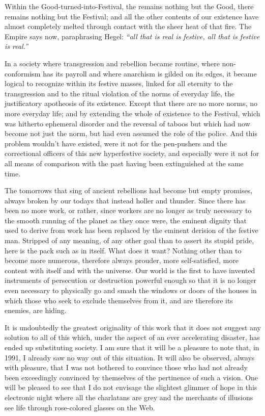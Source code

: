 Within the Good-turned-into-Festival, the remains nothing but the Good, there remains nothing but the Festival; and all the other contents of our existence have almost completely melted through contact with the sheer heat of that fire. The Empire says now, paraphrasing Hegel: \textit{``all that is real is festive, all that is festive is real.''}

In a society where transgression and rebellion became routine, where non-conformism has its payroll and where anarchism is gilded on its edges, it became logical to recognize within its festive masses, linked for all eternity to the transgression and to the ritual violation of the norms of everyday life, the justificatory apotheosis of its existence. Except that there are no more norms, no more everyday life; and by extending the whole of existence to the Festival, which was hitherto ephemeral disorder and the reversal of taboos but which had now become not just the norm, but had even assumed the role of the police. And this problem wouldn't have existed, were it not for the pen-pushers and the correctional officers of this new hyperfestive society, and especially were it not for all means of comparison with the past having been extinguished at the same time.

The tomorrows that sing of ancient rebellions had become but empty promises, always broken by our todays that instead holler and thunder. Since there has been no more work, or rather, since workers are no longer as truly necessary to the smooth running of the planet as they once were, the eminent dignity that used to derive from work has been replaced by the eminent derision of the festive man. Stripped of any meaning, of any other goal than to assert its stupid pride, here is the pack such as in itself. What does it want? Nothing other than to become more numerous, therefore always prouder, more self-satisfied, more content with itself and with the universe. Our world is the first to have invented instruments of persecution or destruction powerful enough so that it is no longer even necessary to physically go and smash the windows or doors of the houses in which those who seek to exclude themselves from it, and are therefore its enemies, are hiding.

It is undoubtedly the greatest originality of this work that it does not suggest any solution to all of this which, under the aspect of an ever accelerating disaster, has ended up substituting society. I am sure that it will be a pleasure to note that, in 1991, I already saw no way out of this situation. It will also be observed, always with pleasure, that I was not bothered to convince those who had not already been exceedingly convinced by themselves of the pertinence of such a vision. One will be pleased to see that I do not envisage the slightest glimmer of hope in this electronic night where all the charlatans are grey and the merchants of illusions see life through rose-colored glasses on the Web.

